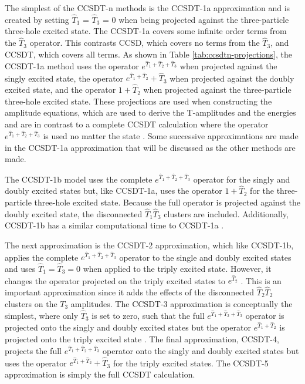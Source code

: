     The simplest of the CCSDT-n methods is the CCSDT-1a approximation and is created by setting $\hat{T}_1$ = $\hat{T}_3$ = 0 when being projected against the three-particle three-hole excited state. The CCSDT-1a covers some infinite order terms from the $\hat{T}_3$ operator. This contrasts CCSD, which covers no terms from the $\hat{T}_3$, and CCSDT, which covers all terms. As shown in Table \ref{tab:ccsdtn-projections}, the CCSDT-1a method uses the operator $e^{\hat{T}_1 + \hat{T}_2 + \hat{T}_3}$ when projected against the singly excited state, the operator $e^{\hat{T}_1 + \hat{T}_2} + \hat{T}_3$ when projected against the doubly excited state, and the operator $ 1 + \hat{T}_2$ when projected against the three-particle three-hole excited state. These projections are used when constructing the amplitude equations, which are used to derive the T-amplitudes and the energies and are in contrast to a complete CCSDT calculation where the operator $e^{\hat{T}_1 + \hat{T}_2 + \hat{T}_3}$ is used no matter the state \cite{Ref155, Ref157}. Some successive approximations are made in the CCSDT-1a approximation that will be discussed as the other methods are made.

    The CCSDT-1b model uses the complete $e^{\hat{T}_1 + \hat{T}_2 + \hat{T}_3}$ operator for the singly and doubly excited states but, like CCSDT-1a, uses the operator $ 1 + \hat{T}_2$ for the three-particle three-hole excited state. Because the full operator is projected against the doubly excited state, the disconnected $\hat{T}_1\hat{T}_3$ clusters are included. Additionally, CCSDT-1b has a similar computational time to CCSDT-1a \cite{Ref157}.

    The next approximation is the CCSDT-2 approximation, which like CCSDT-1b, applies the complete $e^{\hat{T}_1 + \hat{T}_2 + \hat{T}_3}$ operator to the single and doubly excited states and uses $\hat{T}_1 = \hat{T}_3 = 0$ when applied to the triply excited state. However, it changes the operator projected on the triply excited states to $e^{\hat{T}_2}$ \cite{Ref155, Ref157}. This is an important approximation since it adds the effects of the disconnected $\hat{T}_2\hat{T}_2$ clusters on the $T_3$ amplitudes. The CCSDT-3 approximation is conceptually the simplest, where only $\hat{T}_3$ is set to zero, such that the full $e^{\hat{T}_1 + \hat{T}_2 + \hat{T}_3}$ operator is projected onto the singly and doubly excited states but the operator $e^{\hat{T}_1 + \hat{T}_2}$ is projected onto the triply excited state \cite{Ref157}. The final approximation, CCSDT-4, projects the full $e^{\hat{T}_1 + \hat{T}_2 + \hat{T}_3}$ operator onto the singly and doubly excited states but uses the operator $e^{\hat{T}_1 + \hat{T}_2} + \hat{T}_3$ for the triply excited states. The CCSDT-5 approximation is simply the full CCSDT calculation.

